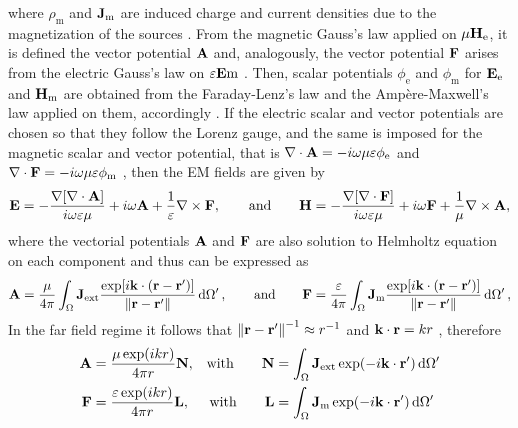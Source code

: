 where $\rho_\text{m}$ and $\vb{J}_\text{m}$ are  induced charge and current densities due to the magnetization of the sources \cite{jin_theory_2010}. From the magnetic Gauss's law applied on $\mu\vb{H}_\text{e}$, it is defined the vector potential $\vb{A}$ and, analogously, the vector potential $\vb{F}$ arises from the electric Gauss's law on $\varepsilon\vb{E}\text{m}$ \cite{jin_theory_2010}. Then, scalar potentials $\phi_\text{e}$ and $\phi_\text{m}$ for $\vb{E}_\text{e} $ and $\vb{H}_\text{m}$ are obtained from the Faraday-Lenz's law and the Ampère-Maxwell's law applied on them, accordingly \cite{jin_theory_2010}. If the electric scalar and vector potentials are chosen so that they follow the Lorenz gauge, and the same is imposed for the magnetic scalar and vector potential, that is $\nabla\cdot\vb{A} = -i\omega\mu\varepsilon \phi_\text{e}$ and $\nabla\cdot\vb{F} = -i\omega\mu\varepsilon \phi_\text{m}$ \cite{zangwill_modern_2013}, then the EM fields are given by
%
\begin{align}
    \vb{E} = - \frac{\nabla[\nabla\cdot\vb{A}]}{i\omega\varepsilon\mu} + i \omega\vb{A} + \frac{1}{\varepsilon}\nabla\times\vb{F},
    \qquad
    \text{and}
    \qquad
    \vb{H} =- \frac{\nabla[\nabla\cdot\vb{F}]}{i\omega\varepsilon\mu} + i \omega\vb{F} + \frac{1}{\mu}\nabla\times\vb{A},
    \label{eq:EMFields}
\end{align}
%
where the vectorial potentials $\vb{A}$ and $\vb{F}$ are also solution to Helmholtz equation on each component and thus can be expressed as \cite{jin_theory_2010}
%
\begin{align}
    \vb{A} = \frac{\mu}{4\pi} \int_\Omega \vb{J}_\text{ext}  \frac{\exp[i\vb{k}\cdot(\vb{r}-\vb{r}')]}{\norm{\vb{r}-\vb{r}'}}\dd{\Omega'},
    \qquad
    \text{and}
    \qquad
    \vb{F} = \frac{\varepsilon}{4\pi} \int_\Omega \vb{J}_\text{m}  \frac{\exp[i\vb{k}\cdot(\vb{r}-\vb{r}')]}{\norm{\vb{r}-\vb{r}'}}\dd{\Omega'},
\end{align}
%
In the far field regime it follows that $\norm{\vb{r}-\vb{r}'}^{-1}\approx r^{-1}$ and $\vb{k}\cdot \vb{r} = kr$ \cite{jackson_classical_1999,zangwill_modern_2013}, therefore
%
\begin{subequations}
    \label{eq:AF}
\begin{align}
    \vb{A} &= \frac{\mu\exp(ikr)}{4\pi r}\vb{N},         &\text{with} \qquad \vb{N} &= \int_\Omega \vb{J}_\text{ext}  \exp(-i\vb{k}\cdot\vb{r}')\dd{\Omega'}\\
    \vb{F} &= \frac{\varepsilon\exp(ikr)}{4\pi r}\vb{L}, &\text{with} \qquad \vb{L} &= \int_\Omega \vb{J}_\text{m}  \exp(-i\vb{k}\cdot\vb{r}')\dd{\Omega'}
\end{align}
\end{subequations}

